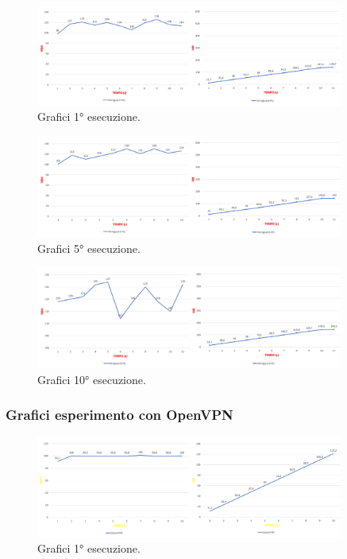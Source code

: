 \begin{figure}[h] \includegraphics[width=0.9\textwidth] {Tesi magistrale/capitoli/images/46.png}
\centering
\caption{Grafici 1° esecuzione.}
\end{figure}

\begin{figure}[h] \includegraphics[width=0.9\textwidth] {Tesi magistrale/capitoli/images/47.png}
\centering
\caption{Grafici 5° esecuzione.}
\end{figure}

\begin{figure}[h] \includegraphics[width=0.9\textwidth] {Tesi magistrale/capitoli/images/48.png}
\centering
\caption{Grafici 10° esecuzione.}
\end{figure}

\newpage
\subsubsection{Grafici esperimento con OpenVPN}

\begin{figure}[h] \includegraphics[width=0.9\textwidth] {Tesi magistrale/capitoli/images/49.png}
\centering
\caption{Grafici 1° esecuzione.}
\end{figure}

